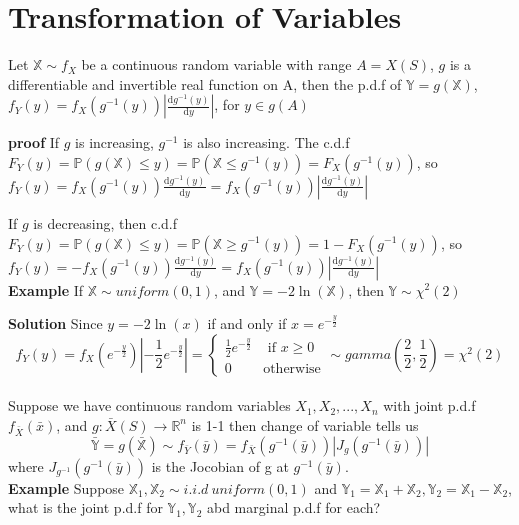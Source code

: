 \documentclass[a4paper,12pt]{article}
\begin{document}
\newpage
\section{Transformation of Variables}
Let $\mathbb{X} \sim f_X$ be a continuous random variable with range $A = X(S)$, $g$ is a differentiable and invertible real function on A, then the p.d.f of $\mathbb{Y} = g(\mathbb{X})$, $f_Y(y) = f_X(g^{-1}(y)) |\frac{\mathrm{d}g^{-1}(y)}{\mathrm{d}y} |$, for $y\in g(A)$

\textbf{proof} If $g$ is increasing, $g^{-1}$ is also increasing.  The c.d.f $F_Y(y) = \mathbb{P}( g(\mathbb{X}) \leq y ) = \mathbb{P}( \mathbb{X} \leq g^{-1}(y) ) = F_X( g^{-1}(y) )$, so $f_Y(y) = f_X(g^{-1}(y)) \frac{\mathrm{d}g^{-1}(y)}{\mathrm{d}y} = f_X(g^{-1}(y)) |\frac{\mathrm{d}g^{-1}(y)}{\mathrm{d}y} |$


If $g$ is decreasing, then c.d.f $F_Y(y) = \mathbb{P}( g(\mathbb{X}) \leq y ) = \mathbb{P}( \mathbb{X} \geq g^{-1}(y) ) = 1 - F_X( g^{-1}(y) )$, so $f_Y(y) = -f_X(g^{-1}(y)) \frac{\mathrm{d}g^{-1}(y)}{\mathrm{d}y}  = f_X(g^{-1}(y)) |\frac{\mathrm{d}g^{-1}(y)}{\mathrm{d}y} |$\\

\textbf{Example}
If $\mathbb{X} \sim uniform(0, 1)$, and $\mathbb{Y} = -2 \ln(\mathbb{X})$, then $\mathbb{Y} \sim \chi^2(2)$

\textbf{Solution}
Since $y=-2\ln(x)$ if and only if $x = e^{-\frac{y}{2}}$
$$f_Y(y) = f_X(e^{-\frac{y}{2}}) | -\frac{1}{2} e^{-\frac{y}{2}} | = 
\begin{cases}
	\frac{1}{2} e^{-\frac{y}{2}} & \text{ if } x\geq 0 \\
	0 & \text{otherwise}
\end{cases}
\sim gamma(\frac{2}{2}, \frac{1}{2}) = \chi^2(2)$$\\

Suppose we have continuous random variables $X_1, X_2, ..., X_n$ with joint p.d.f $f_{\bar{X}}( \bar{x} )$, and $g: \bar{X}(S) \to \mathbb{R}^n$ is 1-1 then change of variable tells us
$$\mathbb{\bar{Y}} = g(\mathbb{\bar{X}}) \sim f_{\bar{Y}}(\bar{y}) = f_{\bar{X}}(g^{-1}(\bar{y}))|J_g( g^{-1}(\bar{y}) )|$$
where $J_{g^{-1}}( g^{-1}(\bar{y}))$ is the Jocobian of g at $g^{-1}(\bar{y})$.\\

\textbf{Example}
Suppose $\mathbb{X}_1, \mathbb{X}_2 \sim i.i.d\ uniform(0, 1)$ and $\mathbb{Y}_1 = \mathbb{X}_1 + \mathbb{X}_2, \mathbb{Y}_2 = \mathbb{X}_1 - \mathbb{X}_2$, what is the joint p.d.f for $\mathbb{Y}_1, \mathbb{Y}_2$ abd marginal p.d.f for each?\\
\end{document}
